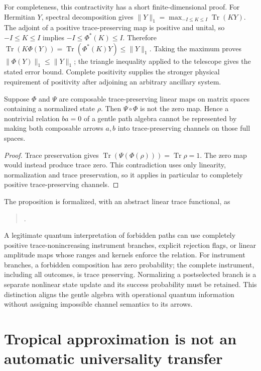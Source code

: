For completeness, this contractivity has a short finite-dimensional proof.
For Hermitian $Y$, spectral decomposition gives
$\|Y\|_1=\max_{-I\le K\le I}\operatorname{Tr}(KY)$.
The adjoint of a positive trace-preserving map is positive and unital, so
$-I\le K\le I$ implies $-I\le\Phi^*(K)\le I$. Therefore
$\operatorname{Tr}(K\Phi(Y))=\operatorname{Tr}(\Phi^*(K)Y)\le\|Y\|_1$.
Taking the maximum proves $\|\Phi(Y)\|_1\le\|Y\|_1$; the triangle
inequality applied to the telescope gives the stated error bound. Complete
positivity supplies the stronger physical requirement of positivity after
adjoining an arbitrary ancillary system.

\begin{proposition}
\label{prop:transport-trace-zero-obstruction}
Suppose $\Phi$ and $\Psi$ are composable trace-preserving linear maps on
matrix spaces containing a normalized state $\rho$. Then
$\Psi\circ\Phi$ is not the zero map. Hence a nontrivial relation
$ba=0$ of a gentle path algebra cannot be represented by making both
composable arrows $a,b$ into trace-preserving channels on those full spaces.
\end{proposition}
\begin{proof}
Trace preservation gives
$\operatorname{Tr}(\Psi(\Phi(\rho)))=\operatorname{Tr}\rho=1$.
The zero map would instead produce trace zero. This contradiction uses
only linearity, normalization and trace preservation, so it applies in
particular to completely positive trace-preserving channels.
\end{proof}

The proposition is formalized, with an abstract linear trace functional, as
\begin{quote}\small
{}.
\end{quote}
A legitimate quantum interpretation of
forbidden paths can use completely positive trace-non\-increasing instrument
branches, explicit rejection flags, or linear amplitude maps whose ranges
and kernels enforce the relation. For instrument branches, a forbidden
composition has zero probability; the complete instrument, including all
outcomes, is trace preserving. Normalizing a postselected branch is a
separate nonlinear state update and its success probability must be retained.
This distinction aligns the gentle algebra with operational quantum
information without assigning impossible channel semantics to its arrows.

\section{Tropical approximation is not an automatic universality transfer}

